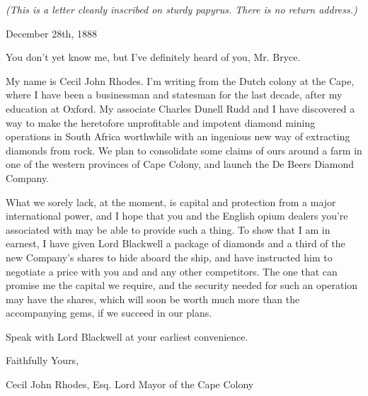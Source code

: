 \documentclass[white]{airship}
\begin{document}
\name{\wDeBeersMob{}} %
{\em (This is a letter cleanly inscribed on sturdy papyrus. There is no return address.)}

December 28th, 1888

You don't yet know me, but I've definitely heard of you, Mr. Bryce.

My name is Cecil John Rhodes. I'm writing from the Dutch colony at the Cape, where I have been a businessman and statesman for the last decade, after my education at Oxford. My associate Charles Dunell Rudd and I have discovered a way to make the heretofore unprofitable and impotent diamond mining operations in South Africa worthwhile with an ingenious new way of extracting diamonds from rock. We plan to consolidate some claims of ours around a farm in one of the western provinces of Cape Colony, and launch the De Beers Diamond Company.

What we sorely lack, at the moment, is capital and protection from a major international power, and I hope that you and the English opium dealers you're associated with may be able to provide such a thing. To show that I am in earnest, I have given Lord Blackwell a package of diamonds and a third of the new Company's shares to hide aboard the ship, and have instructed him to negotiate a price with you and and any other competitors. The one that can promise me the capital we require, and the security needed for such an operation may have the shares, which will soon be worth much more than the accompanying gems, if we succeed in our plans.

Speak with Lord Blackwell at your earliest convenience.

Faithfully Yours, 

Cecil John Rhodes, Esq.
Lord Mayor of the Cape Colony
\end{document}
